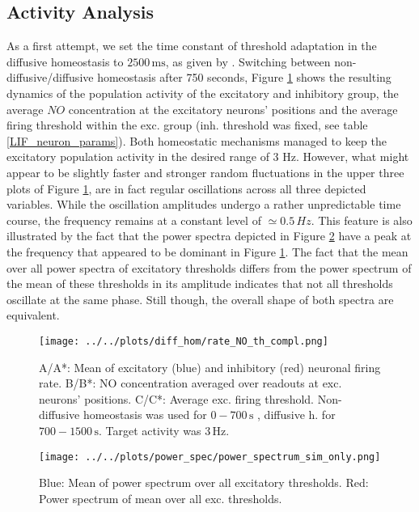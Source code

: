 \documentclass[10pt,a4paper]{article}
\begin{document}
\subsection{Activity Analysis} \label{activ_analys}
As a first attempt, we set the time constant of threshold adaptation in the diffusive homeostasis to $\mathrm{2500\, ms}$, as given by \cite{Sweeney_Paper}. Switching between non-diffusive/diffusive homeostasis after 750 seconds, Figure \ref{full_sim_osci} shows the resulting dynamics of the population activity of the excitatory and inhibitory group, the average $NO$ concentration at the excitatory neurons' positions and the average firing threshold within the exc. group (inh. threshold was fixed, see table \ref{LIF_neuron_params}). Both homeostatic mechanisms managed to keep the excitatory population activity in the desired range of 3 Hz. However, what might appear to be slightly faster and stronger random fluctuations in the upper three plots of Figure \ref{full_sim_osci}, are in fact regular oscillations across all three depicted variables. While the oscillation amplitudes undergo a rather unpredictable time course, the frequency remains at a constant level of $\simeq 0.5\, Hz$. This feature is also illustrated by the fact that the power spectra depicted in Figure \ref{Power_Spec_without_Analysis} have a peak at the frequency that appeared to be dominant in Figure \ref{full_sim_osci}. The fact that the mean over all power spectra of excitatory thresholds differs from the power spectrum of the mean of these thresholds in its amplitude indicates that not all thresholds oscillate at the same phase. Still though, the overall shape of both spectra are equivalent. 
\begin{figure}

\begin{center}
\texttt{[image: ../../plots/diff\_hom/rate\_NO\_th\_compl.png]}
\end{center}
\caption{A/A*: Mean of excitatory (blue) and inhibitory (red) neuronal firing rate. B/B*: NO concentration averaged over readouts at exc. neurons' positions. C/C*: Average exc. firing threshold. Non-diffusive homeostasis was used for $\mathrm{0-700\, s}$ , diffusive h. for $\mathrm{700-1500\, s}$. Target activity was $\mathrm{3\, Hz}$.}
\label{full_sim_osci}
\end{figure}
\begin{figure}
\begin{center}
\texttt{[image: ../../plots/power\_spec/power\_spectrum\_sim\_only.png]}
\caption{Blue: Mean of power spectrum over all excitatory thresholds. Red: Power spectrum of mean over all exc. thresholds.}
\label{Power_Spec_without_Analysis}
\end{center}
\end{figure}
\end{document}
